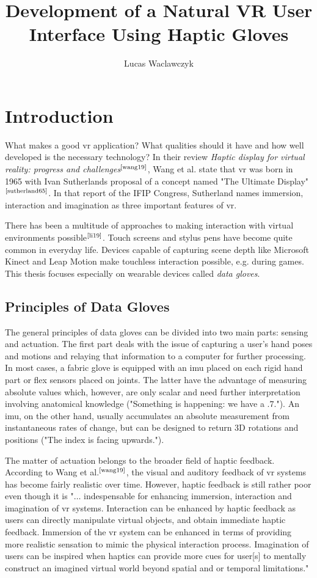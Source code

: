 \documentclass[hyperref, bachelorofscience]{cgvpub}
\author{Lucas Waclawczyk}
\title{Development of a Natural VR User Interface Using Haptic Gloves}
\newcommand{\newcite}[1]{$ ^{\text{\cite{#1}}} $}
\begin{document}
\glsaddall
	
\chapter{Introduction}
What makes a good \acrfull{vr} application? What qualities should it have and how well developed is the necessary technology? In their review \emph{Haptic display for virtual reality: progress and challenges}\newcite{wang19}, Wang et al. state that \gls{vr} was born in 1965 with Ivan Sutherlands proposal of a concept named "The Ultimate Display"\newcite{sutherland65}. In that report of the IFIP Congress, Sutherland names immersion, interaction and imagination as three important features of \acrshort{vr}. 

There has been a multitude of approaches to making interaction with virtual environments possible\newcite{li19}. Touch screens and stylus pens have become quite common in everyday life. Devices capable of capturing scene depth like Microsoft Kinect and Leap Motion make touchless interaction possible, e.g. during games. This thesis focuses especially on wearable devices called \emph{data gloves}.

\section{Principles of Data Gloves}
The general principles of data gloves can be divided into two main parts: sensing and actuation. The first part deals with the issue of capturing a user's hand poses and motions and relaying that information to a computer for further processing. In most cases, a fabric glove is equipped with an \acrfull{imu} placed on each rigid hand part or flex sensors placed on joints. The latter have the advantage of measuring absolute values which, however, are only scalar and need further interpretation involving anatomical knowledge ("Something is happening: we have a $ .7 $."). An \acrfull{imu}, on the other hand, usually accumulates an absolute measurement from instantaneous rates of change, but can be designed to return 3D rotations and positions ("The index is facing upwards.").

The matter of actuation belongs to the broader field of haptic feedback. According to Wang et al.\newcite{wang19}, the visual and auditory feedback of \acrshort{vr} systems has become fairly realistic over time. However, haptic feedback is still rather poor even though it is "$\dots$ indespensable for enhancing immersion, interaction and imagination of \acrshort{vr} systems. Interaction can be enhanced by haptic feedback as users can directly manipulate virtual objects, and obtain immediate haptic feedback. Immersion of the \acrshort{vr} system can be enhanced in terms of providing more realistic sensation to mimic the physical interaction process. Imagination of users can be inspired when haptics can provide more cues for user[s] to mentally construct an imagined virtual world beyond spatial and or temporal limitations."
\end{document}
